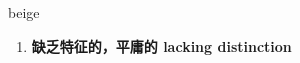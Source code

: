 
\begin{frame}
{\huge beige}
\begin{center}
\begin{enumerate}\Large
  \item \textbf{缺乏特征的，平庸的 lacking distinction}
\end{enumerate}
\end{center}
\end{frame}

